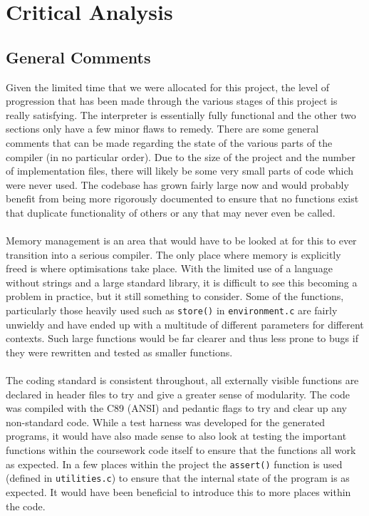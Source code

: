 \chapter{Critical Analysis}

\section{General Comments}
Given the limited time that we were allocated for this project, the level of progression that has been made through the various stages of this project is really satisfying. The interpreter is essentially fully functional and the other two sections only have a few minor flaws to remedy. There are some general comments that can be made regarding the state of the various parts of the compiler (in no particular order). Due to the size of the project and the number of implementation files, there will likely be some very small parts of code which were never used. The codebase has grown fairly large now and would probably benefit from being more rigorously documented to ensure that no functions exist that duplicate functionality of others or any that may never even be called.
\ \\ \ \\
Memory management is an area that would have to be looked at for this to ever transition into a serious compiler. The only place where memory is explicitly freed is where optimisations take place. With the limited use of a language without strings and a large standard library, it is difficult to see this becoming a problem in practice, but it still something to consider. Some of the functions, particularly those heavily used such as \verb!store()! in \verb!environment.c! are fairly unwieldy and have ended up with a multitude of different parameters for different contexts. Such large functions would be far clearer and thus less prone to bugs if they were rewritten and tested as smaller functions.
\ \\ \ \\
The coding standard is consistent throughout, all externally visible functions are declared in header files to try and give a greater sense of modularity. The code was compiled with the C89 (ANSI) and pedantic flags to try and clear up any non-standard code. While a test harness was developed for the generated programs, it would have also made sense to also look at testing the important functions within the coursework code itself to ensure that the functions all work as expected. In a few places within the project the \verb!assert()! function is used (defined in \verb!utilities.c!) to ensure that the internal state of the program is as expected. It would have been beneficial to introduce this to more places within the code.
